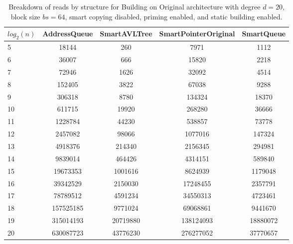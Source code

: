 \begin{table}[]
\centering
\begin{tabular}{|l|c|c|c|c|}
$log_2(n)$ & AddressQueue & SmartAVLTree & SmartPointerOriginal & SmartQueue \\ \hline
5 & 18144 & 260 & 7971 & 1112 \\ \hline
6 & 36007 & 666 & 15820 & 2218 \\ \hline
7 & 72946 & 1626 & 32092 & 4514 \\ \hline
8 & 152405 & 3822 & 67038 & 9288 \\ \hline
9 & 306318 & 8780 & 134324 & 18370 \\ \hline
10 & 611715 & 19920 & 268280 & 36666 \\ \hline
11 & 1228784 & 44230 & 538857 & 73778 \\ \hline
12 & 2457082 & 98066 & 1077016 & 147324 \\ \hline
13 & 4918376 & 214340 & 2156345 & 294981 \\ \hline
14 & 9839014 & 464426 & 4314151 & 589840 \\ \hline
15 & 19673353 & 1001616 & 8624939 & 1179048 \\ \hline
16 & 39342529 & 2150030 & 17248455 & 2357791 \\ \hline
17 & 78789512 & 4591234 & 34550313 & 4723461 \\ \hline
18 & 157525185 & 9771024 & 69068861 & 9441670 \\ \hline
19 & 315014193 & 20719880 & 138124093 & 18880072 \\ \hline
20 & 630087723 & 43776230 & 276277052 & 37770657 \\ \hline
\end{tabular}
\caption{Breakdown of reads by structure for Building on Original architecture with degree $d=20$, block size $bs=64$, smart copying disabled, priming enabled, and static building enabled.}
    \label{tab:reads_by_structure_build_d20_bs64_copiesfalse_primetrue_staticinsertiontrue_ptoriginal_movefalse}
\end{table}

